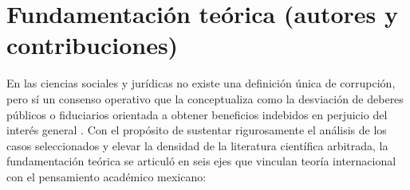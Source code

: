 

\section{Fundamentación teórica (autores y contribuciones)}

En las ciencias sociales y jurídicas no existe una definición única de corrupción, pero sí un consenso operativo que la conceptualiza como la desviación de deberes públicos o fiduciarios orientada a obtener beneficios indebidos en perjuicio del interés general \citep{inegi2016}. Con el propósito de sustentar rigurosamente el análisis de los casos seleccionados y elevar la densidad de la literatura científica arbitrada, la fundamentación teórica se articuló en seis ejes que vinculan teoría internacional con el pensamiento académico mexicano:

